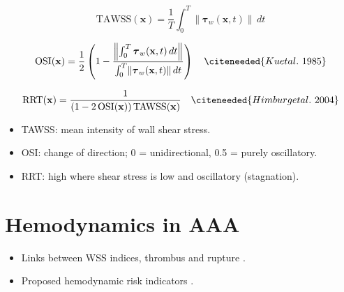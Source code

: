 \begin{equation}
    \mathrm{TAWSS}(\mathbf{x}) = \frac{1}{T}\int_0^T \lVert \boldsymbol{\tau}_w(\mathbf{x},t) \rVert \, dt
\end{equation}

\begin{equation}
    \mathrm{OSI}(\mathbf{x}) = \frac{1}{2}\left(1 - \frac{\left\lVert \int_0^T \boldsymbol{\tau}_w(\mathbf{x},t)\,dt \right\rVert}{\int_0^T \lVert \boldsymbol{\tau}_w(\mathbf{x},t) \rVert \, dt}\right)
    \quad \citeneeded{Ku et al.\ 1985}
\end{equation}

\begin{equation}
    \mathrm{RRT}(\mathbf{x}) = \frac{1}{\left(1 - 2\,\mathrm{OSI}(\mathbf{x})\right)\mathrm{TAWSS}(\mathbf{x})}
    \quad \citeneeded{Himburg et al.\ 2004}
\end{equation}

\begin{itemize}
    \item TAWSS: mean intensity of wall shear stress.
    \item OSI: change of direction; 0 = unidirectional, 0.5 = purely oscillatory.
    \item RRT: high where shear stress is low and oscillatory (stagnation).
\end{itemize}

\section{Hemodynamics in AAA}
\begin{itemize}
    \item Links between WSS indices, thrombus and rupture \cite{qiu_association_2022, zambrano_association_2022, belkacemi_intraluminal_2023, meyrignac_combining_2020}.
    \item Proposed hemodynamic risk indicators \cite{pan_proposal_2023, mutlu_how_2023}.
\end{itemize}
